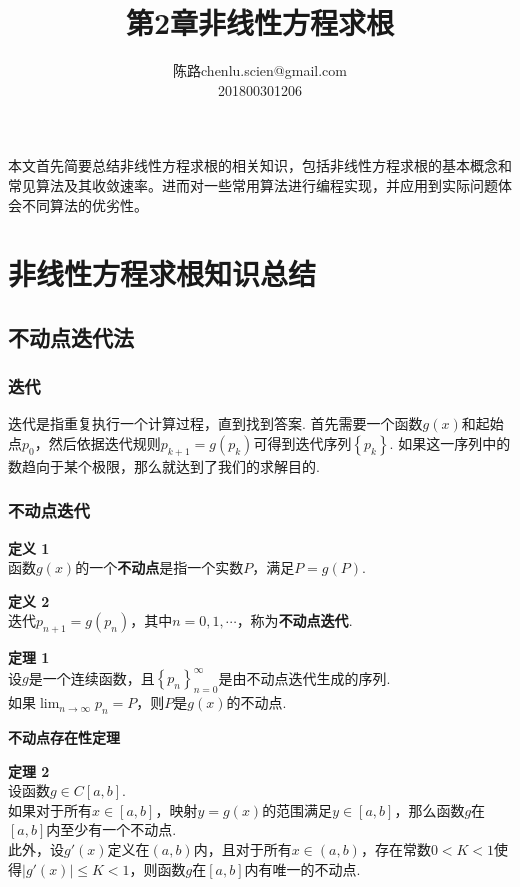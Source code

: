 \documentclass[UTF8]{ctexart}
\makeatletter
\newenvironment{dingyi}[2][定义]
{\begin{mdframed}[backgroundcolor=gray!20] \textbf{#1 #2} \\}
	{\end{mdframed}}
\newenvironment{dingli}[2][定理]
{\begin{mdframed}[backgroundcolor=gray!20] \textbf{#1 #2} \\}
	{\end{mdframed}}
\newcommand\assignmentNumber{2}
\newcommand\studentName{陈路}
\newcommand\studentEmail{chenlu.scien@gmail.com}
\newcommand\studentNumber{201800301206}
\makeatother
\begin{document}
    
    \title{第\assignmentNumber 章\quad 非线性方程求根}
    
    \author{\name \studentName \email \studentEmail \\
    \studentNumber
    }
    
    \maketitle
本文首先简要总结非线性方程求根的相关知识，包括非线性方程求根的基本概念和常见算法及其收敛速率。进而对一些常用算法进行编程实现，并应用到实际问题体会不同算法的优劣性。

\section{非线性方程求根知识总结}
\subsection{不动点迭代法}
\subsubsection{迭代}
迭代是指重复执行一个计算过程，直到找到答案. 首先需要一个函数$g(x)$和起始点$p_{0}$，然后依据迭代规则$p_{k+1}=g(p_{k})$可得到迭代序列$\left\{p_{k}\right\}$. 如果这一序列中的数趋向于某个极限，那么就达到了我们的求解目的.

\subsubsection{不动点迭代}
\begin{dingyi}{1}
	函数$g(x)$的一个\textbf{不动点}是指一个实数$P$，满足$P=g(P)$.
\end{dingyi}

\begin{dingyi}{2}
	迭代$p_{n+1}=g(p_{n})$，其中$n=0,1,\cdots$，称为\textbf{不动点迭代}.
\end{dingyi}

\begin{dingli}{1}
	设$g$是一个连续函数，且$\left\{p_{n}\right\}_{n=0}^{\infty}$是由不动点迭代生成的序列.\\
	如果$\lim _{n \rightarrow \infty} p_{n}=P$，则$P$是$g(x)$的不动点.
\end{dingli}

\textbf{不动点存在性定理}
\begin{dingli}{2}
	设函数$g \in C[a,b]$.\\
	如果对于所有$x \in [a,b]$，映射$y=g(x)$的范围满足$y \in [a,b]$，那么函数$g$在$[a,b]$内至少有一个不动点.\\
	此外，设$g'(x)$定义在$(a,b)$内，且对于所有$x \in (a,b)$，存在常数$0<K<1$使得$|g'(x)| \leqslant K <1$，则函数$g$在$[a,b]$内有唯一的不动点.
\end{dingli}
\end{document}
